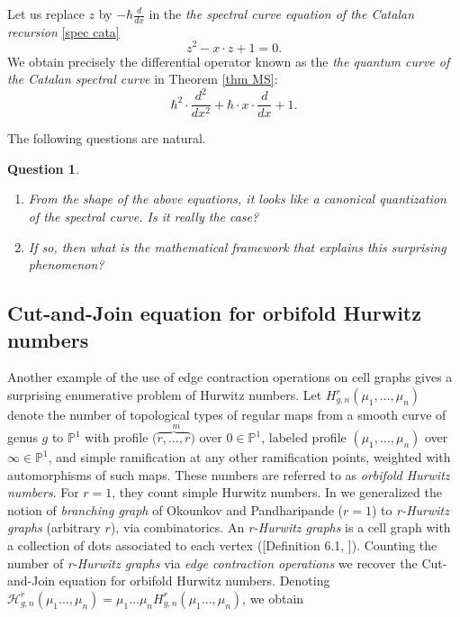 \documentclass[oneside, 11pt]{amsart}
\newtheorem{quest}[thm]{Question}
\theoremstyle{definition}
\numberwithin{equation}{subsection}
\newcommand{\bP}{{\mathbb{P}}}
\newcommand{\cH}{{\mathcal{H}}}
\begin{document}
Let us replace $z$ by $-\hbar \frac{d}{dx}$ in the \textit{the spectral curve equation of the Catalan recursion} \eqref{spec cata}
$$z^2-x\cdot z+1=0.$$
 We obtain precisely the differential operator known as the \textit{the quantum curve of the Catalan spectral curve} in Theorem \ref{thm MS}:
$$\hbar^2 \cdot \frac{d^2}{dx^2}+\hbar\cdot x\cdot \frac{d}{dx}+1.$$

The following questions are natural.

\begin{quest}
\begin{enumerate}
\item From the shape of the above equations, it looks like a canonical quantization of the spectral curve. Is it really the case?
\item If so, then what is the mathematical framework that explains this surprising phenomenon? 
\end{enumerate}
\end{quest}

\subsection{Cut-and-Join equation for orbifold Hurwitz numbers} Another example of the use of edge contraction operations on cell graphs gives a surprising enumerative problem of Hurwitz numbers. Let $H_{g,n}^r (\mu_1,\dots,\mu_n)$ denote the number of 
topological types 
of regular maps from a smooth curve of genus $g$ 
to $\bP^1$
with profile $(\overset{m}{\overbrace{r,\dots,r})}$ over $0\in\bP^1$, labeled profile $(\mu_1,\dots,\mu_n)$ over $\infty\in\bP^1$, and simple ramification at any other ramification points, weighted with automorphisms of such maps. These numbers are referred to as \emph{orbifold Hurwitz numbers}. For $r=1$, they count  simple Hurwitz numbers. 
\noindent
In \cite{OD16} we generalized the notion of \textit{branching graph} of Okounkov and Pandharipande 
\cite{OP} ($r=1$) to \textit{r-Hurwitz graphs} (arbitrary $r$), via combinatorics. An \textit{r-Hurwitz graphs} is a cell graph with a collection of dots associated to each vertex ([Definition 6.1, \cite{OD16}]). Counting the number of \textit{r-Hurwitz graphs} via \textit{edge contraction operations} we recover the Cut-and-Join equation for orbifold Hurwitz numbers. Denoting $\cH_{g,n}^r(\mu_1\dots,\mu_n)=\mu_1\ldots \mu_nH_{g,n}^r(\mu_1\dots,\mu_n)$, we obtain
\end{document}
